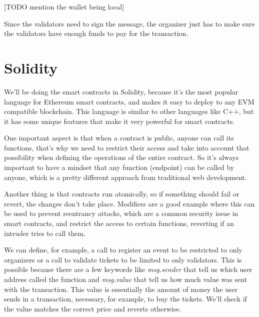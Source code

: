 [TODO mention the wallet being local]


Since the validators need to sign the message, the organizer just has to make
sure the validators have enough funds to pay for the transaction.

% 
% 

\section{Solidity}
\label{sec:solidity}

We'll be doing the smart contracts in Solidity, because it's the most popular
language for Ethereum smart contracts, and makes it easy to deploy to any EVM
compatible blockchain. This language is similar to other languages like C++,
but it has some unique features that make it very powerful for smart contracts.

One important aspect is that when a contract is public, anyone can call its
functions, that's why we need to restrict their access and take into account
that possibility when defining the operations of the entire contract. So it's
always important to have a mindset that any function (endpoint) can be called
by anyone, which is a pretty different approach from traditional web
development.

Another thing is that contracts run atomically, so if something should fail or
revert, the changes don't take place. Modifiers are a good example where this
can be used to prevent reentrancy attacks, which are a common security issue in
smart contracts, and restrict the access to certain functions, reverting if an
intruder tries to call them.

We can define, for example, a call to register an event to be restricted to
only organizers or a call to validate tickets to be limited to only validators.
This is possible because there are a few keywords like \textit{msg.sender} that
tell us which user address called the function and \textit{msg.value} that tell
us how much value was sent with the transaction. This value is essentially the
amount of money the user sends in a transaction, necessary, for example, to buy
the tickets. We'll check if the value matches the correct price and reverts
otherwise.

